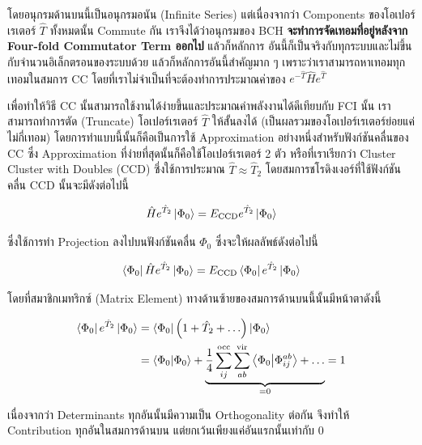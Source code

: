 \noindent โดยอนุกรมด้านบนนี้เป็นอนุกรมอนัน (Infinite Series) แต่เนื่องจากว่า Components ของโอเปอร์เรเตอร์ $\hat{T}$ ทั้งหมดนั้น
Commute กัน เราจึงได้ว่าอนุกรมของ BCH \textbf{จะทำการจัดเทอมที่อยู่หลังจาก Four-fold Commutator Term ออกไป} แล้วก็หลักการ%
อันนี้ก็เป็นจริงกับทุกระบบและไม่ขึ้นกับจำนวนอิเล็กตรอนของระบบด้วย แล้วก็หลักการอันนี้สำคัญมาก ๆ เพราะว่าเราสามารถหาเทอมทุกเทอมในสมการ
CC โดยที่เราไม่จำเป็นที่จะต้องทำการประมาณค่าของ $e^{-\hat{T}} \hat{H} e^{\hat{T}}$

เพื่อทำให้วิธี CC นั้นสามารถใช้งานได้ง่ายขึ้นและประมาณค่าพลังงานได้ดีเทียบกับ FCI นั้น เราสามารถทำการตัด (Truncate) โอเปอร์เรเตอร์ $\hat{T}$
ให้สั้นลงได้ (เป็นผลรวมของโอเปอร์เรเตอร์ย่อยแค่ไม่กี่เทอม) โดยการทำแบบนี้นั้นก็คือเป็นการใช้ Approximation อย่างหนึ่งสำหรับฟังก์ชันคลื่นของ CC
ซึ่ง Approximation ที่ง่ายที่สุดนั้นก็คือใช้โอเปอร์เรเตอร์ 2 ตัว หรือที่เราเรียกว่า Cluster Cluster with Doubles (CCD) ซึ่งใช้การประมาณ
$\hat{T} \approx \hat{T}_2$ โดยสมการชโรดิงเงอร์ที่ใช้ฟังก์ชันคลื่น CCD นั้นจะมีดังต่อไปนี้

\begin{equation}
    \hat{H} e^{\hat{T}_2}\ket{\Phi_0}
    =
    E_{\mathrm{CCD}} e^{\hat{T}_2}\ket{\Phi_0}
\end{equation}

\noindent ซึ่งใช้การทำ Projection ลงไปบนฟังก์ชันคลื่น $\Phi_0$ ซึ่งจะให้ผลลัพธ์ดังต่อไปนี้

\begin{equation}
    \label{eq:ccd_eq_proj}
    \bra{\Phi_0}\hat{H} e^{\hat{T}_2}\ket{\Phi_0}
    =
    E_{\mathrm{CCD}} \bra{\Phi_0}e^{\hat{T}_2}\ket{\Phi_0}
\end{equation}

\noindent โดยที่สมาชิกเมทริกซ์ (Matrix Element) ทางด้านซ้ายของสมการด้านบนนี้นั้นมีหน้าตาดังนี้

\begin{equation}
    \begin{split}
        \bra{\Phi_0}e^{\hat{T}_2}\ket{\Phi_0}
        &= \bra{\Phi_0}\left(1 + \hat{T}_2 + \ldots\right)\ket{\Phi_0} \\
        &=  \braket{\Phi_0}{\Phi_0} +
        \underbrace{
        \frac{1}{4} \sum_{ij}^{\mathrm{occ}} \sum_{ab}^{\mathrm{vir}} \braket{\Phi_0}{\Phi_{ij}^{ab}}
        + \ldots
        }_{
        = 0}
        = 1
    \end{split}
\end{equation}

\noindent เนื่องจากว่า Determinants ทุกอันนั้นมีความเป็น Orthogonality ต่อกัน จึงทำให้ Contribution ทุกอันในสมการด้านบน%
แต่ยกเว้นเพียงแค่อันแรกนั้นเท่ากับ 0

